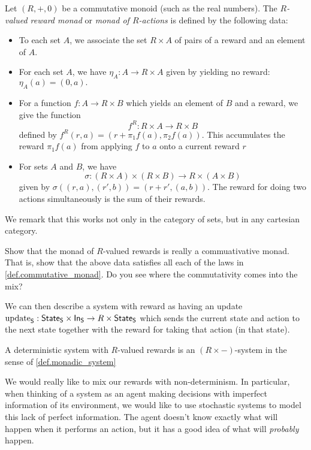 \documentclass[DynamicalBook]{subfiles}
\begin{document}
\begin{definition}
Let $(R, +, 0)$ be a commutative monoid (such as the real numbers). The
\emph{$R$-valued reward monad} or \emph{monad of $R$-actions} is defined by the
following data:
\begin{itemize}
  \item To each set $A$, we associate the set $R \times A$ of pairs of a reward
    and an element of $A$.
  \item For each set $A$, we have $\eta_A : A \to R \times A$ given by yielding
    no reward:
    $\eta_A(a) = (0, a).$
  \item For a function $f : A \to R \times B$ which yields an element of $B$ and
    a reward, we give the function
    \[
      f^R : R \times A \to R \times B
    \]
 defined by $f^R(r, a) = (r + \pi_1f(a), \pi_2f(a))$. This accumulates the
 reward $\pi_1f(a)$ from applying $f$ to $a$ onto a current reward $r$
\item For sets $A$ and $B$, we have
  \[
\sigma : (R \times A) \times (R \times B) \to R \times (A \times B)
\]
given by $\sigma((r, a), (r', b)) = (r + r', (a, b))$. The reward for doing two
actions simultaneously is the sum of their rewards.
  \end{itemize}
  
We remark that this works not only in the category of sets, but in any cartesian category.
\end{definition}

\begin{exercise}
  Show that the monad of $R$-valued rewards is really a commuativative monad.
  That is, show that the above data satisfies all each of the laws in
  \cref{def.commutative_monad}. Do you see where the commutativity comes into
  the mix?
\end{exercise}

We can then describe a system with reward as having an update $\mathrm{update}_{\mathsf{S}} :
\mathsf{State}_{\mathsf{S}} \times \mathsf{In}_{\mathsf{S}} \to R \times \mathsf{State}_{\mathsf{S}}$ which sends the current state
and action to the next state together with the reward for taking that action (in
that state).

\begin{definition}
A deterministic system with $R$-valued rewards is an $(R \times -)$-system in
the sense of \cref{def.monadic_system}
\end{definition}

We would really like to mix our rewards with non-determinism. In particular,
when thinking of a system as an agent making decisions with imperfect
information of its environment, we would like to use stochastic systems to model
this lack of perfect information. The agent doesn't know exactly what will
happen when it performs an action, but it has a good idea of what will
\emph{probably} happen.
\end{document}
